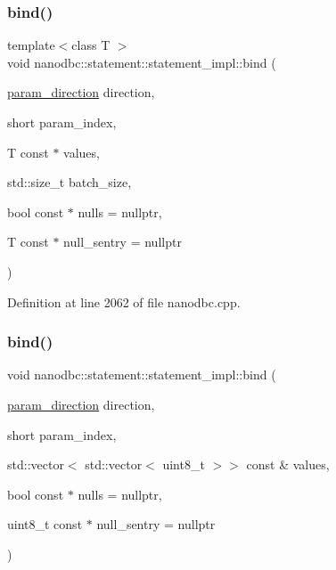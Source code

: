 \mbox{\label{classnanodbc_1_1statement_1_1statement__impl_aae37e90a862ea033c7717b015bf37ffd}} 
\subsubsection{\texorpdfstring{bind()}{bind()}\hspace{0.1cm}{\footnotesize\ttfamily [1/2]}}
{\footnotesize\ttfamily template$<$class T $>$ \\
void nanodbc\+::statement\+::statement\+\_\+impl\+::bind (\begin{DoxyParamCaption}\item[{\mbox{\hyperlink{classnanodbc_1_1statement_a523142f53cbbee8d68a074da993e7fa6}{param\+\_\+direction}}}]{direction,  }\item[{short}]{param\+\_\+index,  }\item[{T const $\ast$}]{values,  }\item[{std\+::size\+\_\+t}]{batch\+\_\+size,  }\item[{bool const $\ast$}]{nulls = {\ttfamily nullptr},  }\item[{T const $\ast$}]{null\+\_\+sentry = {\ttfamily nullptr} }\end{DoxyParamCaption})}



Definition at line 2062 of file nanodbc.\+cpp.

\mbox{\label{classnanodbc_1_1statement_1_1statement__impl_a9055bdd2f018c9e1458459d43b84404e}} 
\subsubsection{\texorpdfstring{bind()}{bind()}\hspace{0.1cm}{\footnotesize\ttfamily [2/2]}}
{\footnotesize\ttfamily void nanodbc\+::statement\+::statement\+\_\+impl\+::bind (\begin{DoxyParamCaption}\item[{\mbox{\hyperlink{classnanodbc_1_1statement_a523142f53cbbee8d68a074da993e7fa6}{param\+\_\+direction}}}]{direction,  }\item[{short}]{param\+\_\+index,  }\item[{std\+::vector$<$ std\+::vector$<$ uint8\+\_\+t $>$$>$ const \&}]{values,  }\item[{bool const $\ast$}]{nulls = {\ttfamily nullptr},  }\item[{uint8\+\_\+t const $\ast$}]{null\+\_\+sentry = {\ttfamily nullptr} }\end{DoxyParamCaption})\hspace{0.3cm}{\ttfamily [inline]}}



